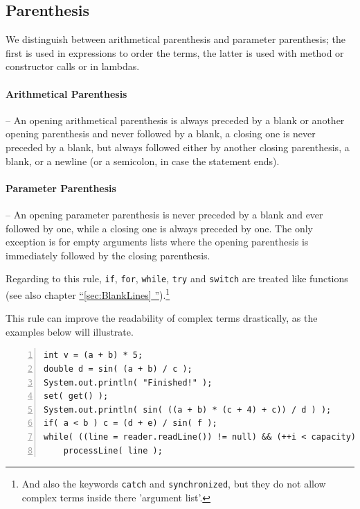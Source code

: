 \documentclass[12pt,a4paper,titlepage, parskip=half, headsepline, footsepline, cleardoubleplain]{scrbook}
\newcommand*{\tqfullref}[1]{\hyperref[{#1}]{“\ref*{#1} \nameref*{#1}”}}
\begin{document}
\subsection{Parenthesis}\label{sec:Parenthesis}
We distinguish between arithmetical parenthesis and parameter parenthesis; the first is used in expressions to order the terms, the latter is used with method or constructor calls or in lambdas.

\paragraph{Arithmetical Parenthesis}–
An opening arithmetical parenthesis is always preceded by a blank or another opening parenthesis and never followed by a blank, a closing one is never preceded by a blank, but always followed either by another closing parenthesis, a blank, or a newline (or a semicolon, in case the statement ends).

\paragraph{Parameter Parenthesis}\label{sec:ParameterParenthesis}–
An opening parameter parenthesis is never preceded by a blank and ever followed by one, while a closing one is always preceded by one. The only exception is for empty arguments lists where the opening parenthesis is immediately followed by the closing parenthesis.

Regarding to this rule, \lstinline|if|, \lstinline|for|, \lstinline|while|, \lstinline|try| and \lstinline|switch| are treated like functions (see also chapter \tqfullref{sec:BlankLines}).\footnote{And also the keywords \lstinline|catch| and \lstinline|synchronized|, but they do not allow complex terms inside there 'argument list'.}

This rule can improve the readability of complex terms drastically, as the examples below will illustrate.

\begin{lstlisting}[numbers=left]
int v = (a + b) * 5;
double d = sin( (a + b) / c );
System.out.println( "Finished!" );
set( get() );
System.out.println( sin( ((a + b) * (c + 4) + c)) / d ) );
if( a < b ) c = (d + e) / sin( f );
while( ((line = reader.readLine()) != null) && (++i < capacity) )
    processLine( line );
\end{lstlisting}
\end{document}
